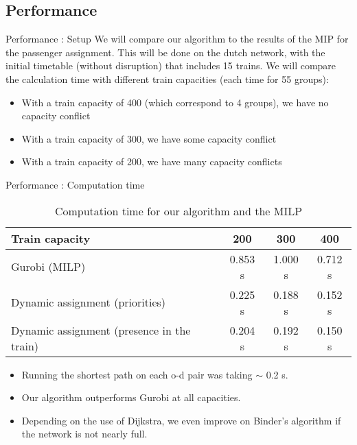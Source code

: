 \documentclass{EESD}
\begin{document}
\subsection{Performance}
\begin{frame}{Performance : Setup}
	We will compare our algorithm to the results of the MIP for the passenger assignment.
	This will be done on the dutch network, with the initial timetable (without disruption) that includes 15 trains. 
	We will compare the calculation time with different train capacities (each time for 55 groups):
	\begin{itemize}
		\item With a train capacity of 400 (which correspond to 4 groups), we have no capacity conflict
		\item With a train capacity of 300, we have some capacity conflict
		\item With a train capacity of 200, we have many capacity conflicts
	\end{itemize}
\end{frame}
\begin{frame}{Performance : Computation time}
	\begin{table}
		\centering
		\begin{tabular}{l|ccc}
			\toprule 
			Train capacity & 200 & 300 & 400 \\
			\midrule
			Gurobi (MILP) & 0.853 s & 1.000 s & 0.712 s\\
			Dynamic assignment (priorities) & 0.225 s & 0.188 s & 0.152 s\\
			Dynamic assignment (presence in the train) & 0.204 s & 0.192 s & 0.150 s\\
			\bottomrule
		\end{tabular}
		\caption{Computation time for our algorithm and the MILP}
	\end{table}
	\begin{itemize}
		\item Running the shortest path on each o-d pair was taking $\sim$ 0.2 s.
		\item Our algorithm outperforms Gurobi at all capacities.
		\item Depending on the use of Dijkstra, we even improve on Binder's algorithm if the network is not nearly full.
	\end{itemize}
\end{frame}
\end{document}
